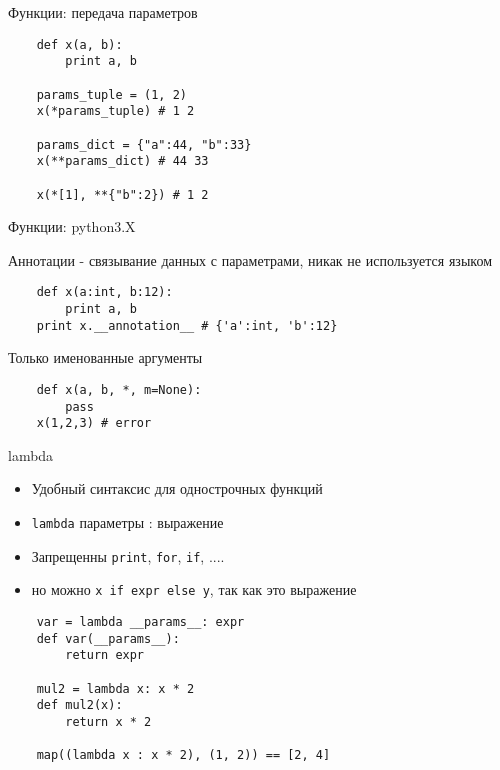 \documentclass{article}
\begin{document}
\begin{center} Функции: передача параметров \end{center}
\vspace{15pt}
\begin{lstlisting}
    def x(a, b):
        print a, b

    params_tuple = (1, 2)
    x(*params_tuple) # 1 2

    params_dict = {"a":44, "b":33}
    x(**params_dict) # 44 33

    x(*[1], **{"b":2}) # 1 2
\end{lstlisting}
\newpage

\begin{center} Функции: python3.X \end{center}
\vspace{15pt}
Аннотации - связывание данных с параметрами, никак не используется языком
\begin{lstlisting}
    def x(a:int, b:12):
        print a, b
    print x.__annotation__ # {'a':int, 'b':12}
\end{lstlisting}
Только именованные аргументы
\begin{lstlisting}
    def x(a, b, *, m=None):
        pass
    x(1,2,3) # error
\end{lstlisting}
\newpage

\begin{center} lambda \end{center}
\begin{itemize}
    \item Удобный синтаксис для однострочных функций
    \item \lstinline!lambda! параметры : выражение
    \item Запрещенны \lstinline!print!, \lstinline!for!, \lstinline!if!, ....
    \item но можно \lstinline!x if expr else y!, так как это выражение
\end{itemize}
\vspace{15pt}
\begin{lstlisting}
    var = lambda __params__: expr
    def var(__params__):
        return expr

    mul2 = lambda x: x * 2
    def mul2(x):
        return x * 2

    map((lambda x : x * 2), (1, 2)) == [2, 4]
\end{lstlisting}
\newpage
\end{document}
